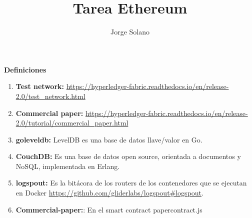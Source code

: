 \documentclass[12pt]{report}
\title{Tarea Ethereum}
\author{Jorge Solano}
\date{ }
\begin{document}
	\textbf{Definiciones}
	\begin{enumerate}
		\item \textbf{Test network: } \url{https://hyperledger-fabric.readthedocs.io/en/release-2.0/test_network.html}\\
		\item \textbf{Commercial paper: } \url{https://hyperledger-fabric.readthedocs.io/en/release-2.0/tutorial/commercial\_paper.html}\\
		\item \textbf{goleveldb:} LevelDB es una base de datos llave/valor en Go.\\
		\item \textbf{CouchDB:} Es una base de datos open source, orientada a documentos y NoSQL, implementada en Erlang.\\
		\item \textbf{logspout:} Es la bitácora de los routers de los contenedores que se ejecutan en Docker \url{https://github.com/gliderlabs/logspout#logspout}.\\
		\item \textbf{Commercial-paper:}: En el smart contract papercontract.js\\
	\end{enumerate}
\end{document}
